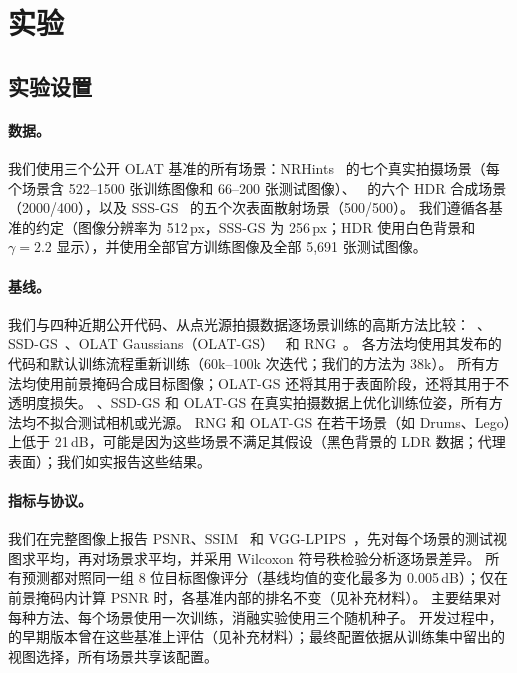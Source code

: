 \section{实验}
\label{sec:experiments}



\subsection{实验设置}
\label{sec:setup}
\paragraph{数据。}
我们使用三个公开 OLAT 基准的所有场景：NRHints~\cite{zeng2023nrhints} 的七个真实拍摄场景（每个场景含 522--1500 张训练图像和 66--200 张测试图像）、\gsthree~\cite{bi2024gs3} 的六个 HDR 合成场景（2000/400），以及 SSS-GS~\cite{dihlmann2024sss} 的五个次表面散射场景（500/500）。
我们遵循各基准的约定（图像分辨率为 512\,px，SSS-GS 为 256\,px；HDR 使用白色背景和 $\gamma=2.2$ 显示），并使用全部官方训练图像及全部 5,691 张测试图像。

\paragraph{基线。}
我们与四种近期公开代码、从点光源拍摄数据逐场景训练的高斯方法比较：\gsthree~\cite{bi2024gs3}、SSD-GS~\cite{zheng2026ssdgs}、OLAT Gaussians（OLAT-GS）~\cite{kuang2024olat} 和 RNG~\cite{fan2025rng}。
各方法均使用其发布的代码和默认训练流程重新训练（60k--100k 次迭代；我们的方法为 38k）。
所有方法均使用前景掩码合成目标图像；OLAT-GS 还将其用于表面阶段，\ours 还将其用于不透明度损失。
\gsthree、SSD-GS 和 OLAT-GS 在真实拍摄数据上优化训练位姿，所有方法均不拟合测试相机或光源。
RNG 和 OLAT-GS 在若干场景（如 Drums、Lego）上低于 21\,dB，可能是因为这些场景不满足其假设（黑色背景的 LDR 数据；代理表面）；我们如实报告这些结果。

\paragraph{指标与协议。}
我们在完整图像上报告 PSNR、SSIM~\cite{wang2004image} 和 VGG-LPIPS~\cite{zhang2018unreasonable}，先对每个场景的测试视图求平均，再对场景求平均，并采用 Wilcoxon 符号秩检验分析逐场景差异。
所有预测都对照同一组 8 位目标图像评分（基线均值的变化最多为 0.005\,dB）；仅在前景掩码内计算 PSNR 时，各基准内部的排名不变（见补充材料）。
主要结果对每种方法、每个场景使用一次训练，消融实验使用三个随机种子。
开发过程中，\ours 的早期版本曾在这些基准上评估（见补充材料）；最终配置依据从训练集中留出的视图选择，所有场景共享该配置。

